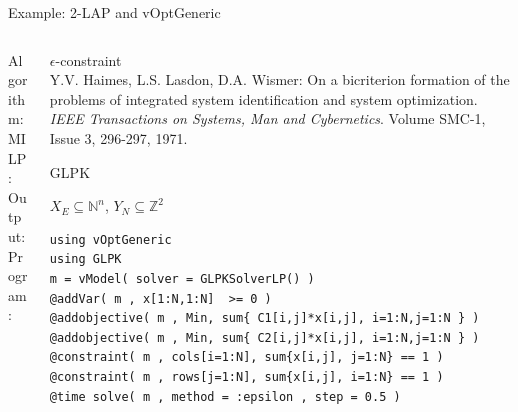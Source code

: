 \documentclass[10pt,xcolor=dvipsnames]{beamer}
\newcommand{\mN}{\mathbb{N}}
\newcommand{\Z}{\mathbb{Z}}
\begin{document}
\begin{frame}[fragile=singleslide]{Example: 2-LAP and vOptGeneric}

\vspace{5mm}
\begin{columns}
%
\begin{column}{0.2\textwidth}
Algorithm: \\
\vspace{18mm}
MILP:\\  
\vspace{2mm}
Output: \\
\vspace{6mm}
Program:
\vspace{30mm}
\end{column}
\begin{column}{0.8\textwidth}
         $\epsilon$-constraint \vspace{1mm}\\
         {\footnotesize Y.V. Haimes, L.S. Lasdon, D.A. Wismer: On a bicriterion formation of the problems of integrated system identification and system optimization. 
         \textit{IEEE Transactions on Systems, Man and Cybernetics}. Volume SMC-1, Issue 3, 296-297, 1971.\\}
\medskip

         GLPK
\medskip

$X_E \subseteq \mN^n$, $Y_N \subseteq \Z^2$
\vspace{3mm}

{\footnotesize
\begin{verbatim}
using vOptGeneric
using GLPK
m = vModel( solver = GLPKSolverLP() )
@addVar( m , x[1:N,1:N]  >= 0 )
@addobjective( m , Min, sum{ C1[i,j]*x[i,j], i=1:N,j=1:N } )
@addobjective( m , Min, sum{ C2[i,j]*x[i,j], i=1:N,j=1:N } )
@constraint( m , cols[i=1:N], sum{x[i,j], j=1:N} == 1 )
@constraint( m , rows[j=1:N], sum{x[i,j], i=1:N} == 1 )
@time solve( m , method = :epsilon , step = 0.5 )
\end{verbatim}
}
          
\end{column}
%
\end{columns}         

       
\end{frame}
\end{document}
